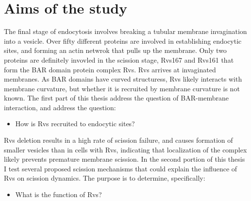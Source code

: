 
\chapter{Aims of the study} %

\label{Ch:Aims} %

The final stage of endocytosis involves breaking a tubular membrane invagination into a vesicle. Over fifty different proteins are involved in establishing endocytic sites, and forming an actin netwrok that pulls up the membrane. Only two proteins are  definitely invovled in the scission stage, Rvs167 and Rvs161 that form the  BAR domain protein complex Rvs. Rvs arrives at invaginated membranes. As BAR domains have curved structuress, Rvs likely interacts with membrane curvature, but whether it is recruited by membrane curvature is not known. The first part of this thesis address the question of BAR-membrane interaction, and address the question:


\begin{itemize}
	\item How is Rvs recruited to endocytic sites? 
\end{itemize}

Rvs deletion results in a high rate of scission failure, and causes formation of smaller vesicles than in cells with Rvs, indicating that localization of the complex likely prevents premature membrane scission. In the second portion of this thesis I test several proposed scission mechanisms that could explain the influence of Rvs on scission dynamics. The purpose is to determine, specifically: 

\begin{itemize}
	\item What is the function of Rvs?
\end{itemize}